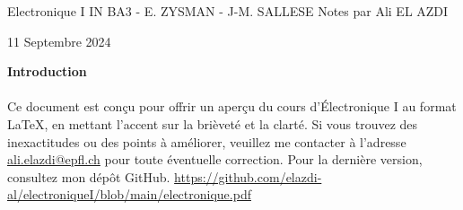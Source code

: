 
\begin{titlepage}
    \centering
    \vspace*{1cm}
    \Huge
    Electronique I \newline
    \vspace{10px}
    \LARGE IN BA3 - E. ZYSMAN - J-M. SALLESE
    \vspace*{10px}
    \newline
    \Large Notes par Ali EL AZDI

    \vfill
    \large
    11 Septembre 2024
\end{titlepage}

\begin{center}
    \vspace*{1cm}
    \textbf{Introduction}
    \newline
    \paragraph[short]{}{Ce document est conçu pour offrir un aperçu du cours d'Électronique I au format \LaTeX{}, en mettant l'accent sur la brièveté et la clarté. Si vous trouvez des inexactitudes ou des points à améliorer, veuillez me contacter à l'adresse \href{mailto:ali.elazdi@epfl.ch}{ali.elazdi@epfl.ch} pour toute éventuelle correction. Pour la dernière version, consultez mon dépôt GitHub.}
    \newline
   \url{https://github.com/elazdi-al/electroniqueI/blob/main/electronique.pdf}
    \newline
\end{center}


\tableofcontents

